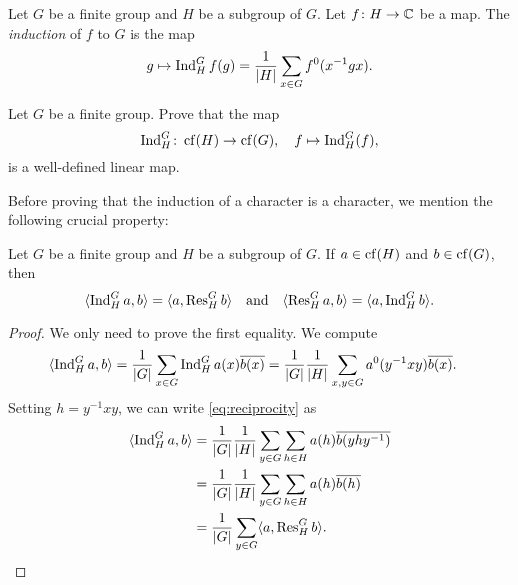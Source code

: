 \begin{definition}
    Let $G$ be a finite group and $H$ be a subgroup of $G$. Let
    $f\colon H\to\mathbb{C}$ be
    a map. The \emph{induction}
    of $f$ to $G$ is the map 
    \begin{align*}
      g\mapsto\operatorname{Ind}_H^Gf(g)=\frac{1}{|H|}\sum_{x\in G}f^0(x^{-1}gx).
    \end{align*}
\end{definition}

\begin{exercise}
\label{xca:induction}
    Let $G$ be a finite group. Prove that
    the map 
    \[
    \operatorname{Ind}_H^G\colon\operatorname{cf}(H)\to\operatorname{cf}(G),\quad  f\mapsto\operatorname{Ind}_H^G(f),
    \]
    is a well-defined linear map. 
\end{exercise}

Before proving that the induction of a character is a character, we  mention the following crucial property:

\begin{theorem}
    Let $G$ be a finite group and $H$ be a subgroup of $G$. 
    If $a\in\operatorname{cf}(H)$ and $b\in\operatorname{cf}(G)$, then
    \[
    \langle\operatorname{Ind}_H^Ga,b\rangle=\langle a,\operatorname{Res}_H^Gb\rangle
    \quad\text{and}\quad
    \langle\operatorname{Res}_H^Ga,b\rangle=\langle a,\operatorname{Ind}_H^Gb\rangle.
    \]
\end{theorem}

\begin{proof}
    We only need to prove the first equality. We compute 
    \begin{equation}
    \label{eq:reciprocity}
    \begin{aligned}
        \langle\operatorname{Ind}_H^Ga,b\rangle 
        &= \frac{1}{|G|}\sum_{x\in G}\operatorname{Ind}_H^Ga(x)\overline{b(x)}
        = \frac{1}{|G|}\frac{1}{|H|}\sum_{x,y\in G}a^0(y^{-1}xy)\overline{b(x)}.
    \end{aligned}
    \end{equation}
    Setting $h=y^{-1}xy$, 
    we can write \eqref{eq:reciprocity} as 
    \begin{align*}
        \langle\operatorname{Ind}_H^Ga,b\rangle
        &=\frac{1}{|G|}\frac{1}{|H|}\sum_{y\in G}\sum_{h\in H}a(h)\overline{b(yhy^{-1})}\\
        &=\frac{1}{|G|}\frac{1}{|H|}\sum_{y\in G}\sum_{h\in H}a(h)\overline{b(h)}\\
        &=\frac{1}{|G|}\sum_{y\in G}\langle a,\operatorname{Res}_H^Gb\rangle.\qedhere 
    \end{align*}
\end{proof}

